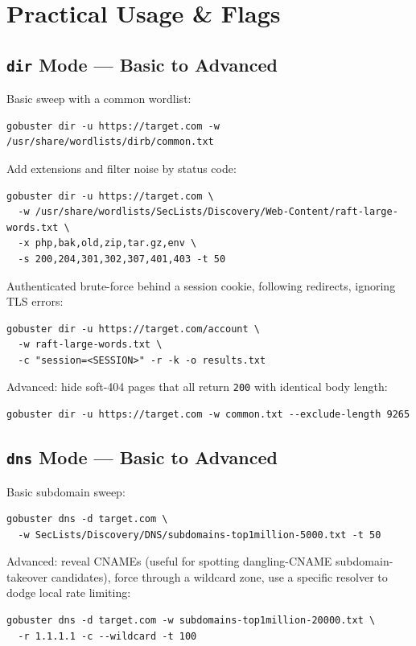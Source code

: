 \documentclass[11pt]{article}
\begin{document}
\section{Practical Usage \& Flags}

\subsection{\texttt{dir} Mode --- Basic to Advanced}

Basic sweep with a common wordlist:
\begin{lstlisting}[style=http]
gobuster dir -u https://target.com -w /usr/share/wordlists/dirb/common.txt
\end{lstlisting}

Add extensions and filter noise by status code:
\begin{lstlisting}[style=http]
gobuster dir -u https://target.com \
  -w /usr/share/wordlists/SecLists/Discovery/Web-Content/raft-large-words.txt \
  -x php,bak,old,zip,tar.gz,env \
  -s 200,204,301,302,307,401,403 -t 50
\end{lstlisting}

Authenticated brute-force behind a session cookie, following redirects, ignoring TLS errors:
\begin{lstlisting}[style=http]
gobuster dir -u https://target.com/account \
  -w raft-large-words.txt \
  -c "session=<SESSION>" -r -k -o results.txt
\end{lstlisting}

Advanced: hide soft-404 pages that all return \texttt{200} with identical body length:
\begin{lstlisting}[style=http]
gobuster dir -u https://target.com -w common.txt --exclude-length 9265
\end{lstlisting}

\subsection{\texttt{dns} Mode --- Basic to Advanced}

Basic subdomain sweep:
\begin{lstlisting}[style=http]
gobuster dns -d target.com \
  -w SecLists/Discovery/DNS/subdomains-top1million-5000.txt -t 50
\end{lstlisting}

Advanced: reveal CNAMEs (useful for spotting dangling-CNAME subdomain-takeover candidates), force through a wildcard zone, use a specific resolver to dodge local rate limiting:
\begin{lstlisting}[style=http]
gobuster dns -d target.com -w subdomains-top1million-20000.txt \
  -r 1.1.1.1 -c --wildcard -t 100
\end{lstlisting}
\end{document}
